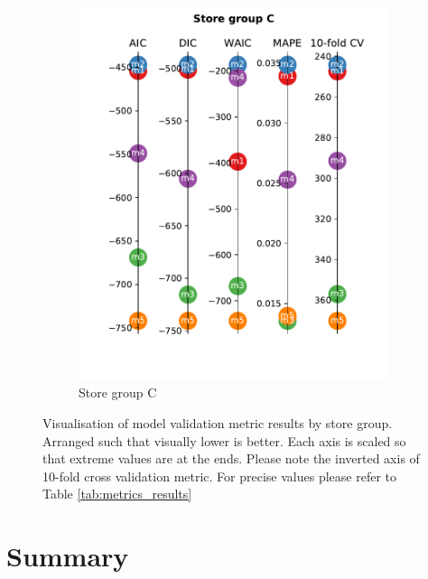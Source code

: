 \documentclass[english, 12pt, a4paper, sci, utf8, a-1b, online]{aaltothesis}
\begin{document}
\begin{figure}
	\begin{subfigure}[htb]{0.5\textwidth}
		\centering
		\includegraphics[width=\textwidth]{../plots/metrics/metrics_plot_C.pdf}
		\caption{Store group C}
		\label{fig:metrics_C}
	\end{subfigure}
	\caption{\label{fig:metrics_visualization}Visualisation of model validation metric results by store group. Arranged such that visually lower is better.
	Each axis is scaled so that extreme values are at the ends. Please note the inverted axis of 10-fold cross validation metric. For 
	precise values please refer to Table \ref{tab:metrics_results}}
\end{figure}






\section{Summary} 




\clearpage

\end{document}

